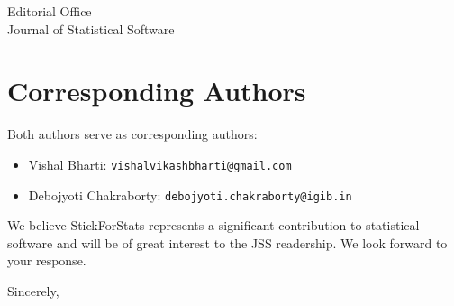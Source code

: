 \documentclass[11pt]{letter}
\begin{document}
\begin{letter}{
Editorial Office\\
Journal of Statistical Software\\
}
\section*{Corresponding Authors}

Both authors serve as corresponding authors:
\begin{itemize}
\item Vishal Bharti: \texttt{vishalvikashbharti@gmail.com}
\item Debojyoti Chakraborty: \texttt{debojyoti.chakraborty@igib.in}
\end{itemize}

We believe StickForStats represents a significant contribution to statistical software and will be of great interest to the JSS readership. We look forward to your response.

\closing{Sincerely,}

\end{letter}
\end{document}
